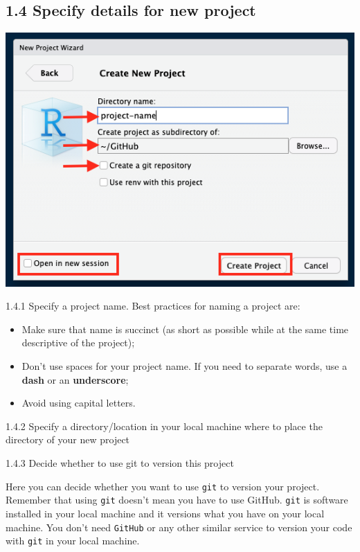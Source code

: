 \documentclass[
  12pt,
]{book}
\providecommand{\tightlist}{%
  \setlength{\itemsep}{0pt}\setlength{\parskip}{0pt}}
\begin{document}
\hypertarget{specify-details-for-new-project}{%
\subsection{1.4 Specify details for new project}\label{specify-details-for-new-project}}

\includegraphics{images/new_project5.png}

1.4.1 Specify a project name. Best practices for naming a project are:

\begin{itemize}
\tightlist
\item
  Make sure that name is succinct (as short as possible while at the same time descriptive of the project);
\item
  Don't use spaces for your project name. If you need to separate words, use a \textbf{dash} or an \textbf{underscore};
\item
  Avoid using capital letters.
\end{itemize}

1.4.2 Specify a directory/location in your local machine where to place the directory of your new project

1.4.3 Decide whether to use git to version this project

Here you can decide whether you want to use \texttt{git} to version your project. Remember that using \texttt{git} doesn't mean you have to use GitHub. \texttt{git} is software installed in your local machine and it versions what you have on your local machine. You don't need \texttt{GitHub} or any other similar service to version your code with \texttt{git} in your local machine.
\end{document}
